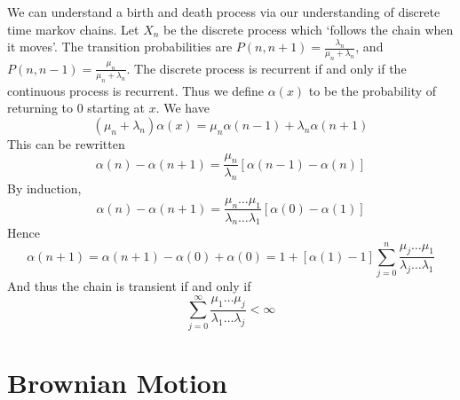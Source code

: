We can understand a birth and death process via our understanding of discrete time markov chains. Let $X_n$ be the discrete process which `follows the chain when it moves'. The transition probabilities are $P(n,n+1) = \frac{\lambda_n}{\mu_n + \lambda_n}$, and $P(n,n-1) = \frac{\mu_n}{\mu_n + \lambda_n}$. The discrete process is recurrent if and only if the continuous process is recurrent. Thus we define $\alpha(x)$ to be the probability of returning to 0 starting at $x$. We have
%
\[ (\mu_n + \lambda_n) \alpha(x) = \mu_n \alpha(n-1) + \lambda_n \alpha(n+1) \]
%
This can be rewritten
%
\[ \alpha(n) - \alpha(n+1) = \frac{\mu_n}{\lambda_n} [\alpha(n-1) - \alpha(n)] \]
%
By induction,
%
\[ \alpha(n) - \alpha(n+1) = \frac{\mu_n \dots \mu_1}{\lambda_n \dots \lambda_1} [\alpha(0) - \alpha(1)] \]
%
Hence
%
\[ \alpha(n+1) = \alpha(n+1) - \alpha(0) + \alpha(0) = 1 + [\alpha(1) - 1] \sum_{j = 0}^n \frac{\mu_j \dots \mu_1}{\lambda_j \dots \lambda_1} \]
%
And thus the chain is transient if and only if
%
\[ \sum_{j = 0}^\infty \frac{\mu_1 \dots \mu_j}{\lambda_1 \dots \lambda_j} < \infty \]






\chapter{Brownian Motion}

